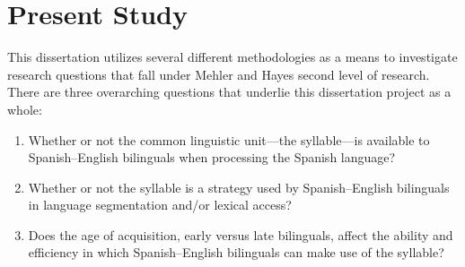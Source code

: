\documentclass[
12pt, %
english, %
doublespacing, %
nolistspacing, %
liststotoc, %
headsepline, %
chapterinoneline, %
openany, %
]{DoctoralThesis}\usepackage[]{graphicx}\usepackage[]{color}
\begin{document}

\section{Present Study}

This dissertation utilizes several different methodologies as a means to investigate research questions that fall under Mehler and Hayes \parencite*{Mehler1981-wp} second level of research. There are three overarching questions that underlie this dissertation project as a whole:
\begin{enumerate}
\item Whether or not the common linguistic unit—the syllable—is available to Spanish–English bilinguals when processing the Spanish language?
\item Whether or not the syllable is a strategy used by Spanish–English bilinguals in language segmentation and/or lexical access?
\item Does the age of acquisition, early versus late bilinguals, affect the ability and efficiency in which Spanish–English bilinguals can make use of the syllable?
\end{enumerate}
\end{document}

